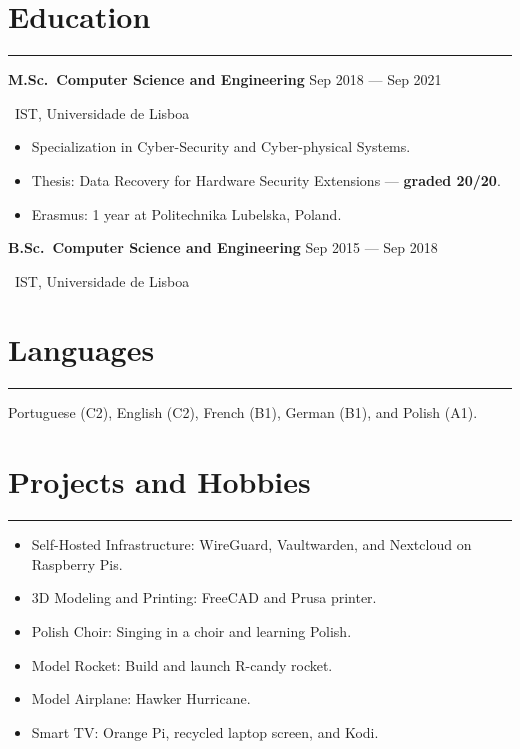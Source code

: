 \documentclass[11pt,a4paper]{article}
\begin{document}
\section*{Education}

\hrule

\textbf{M.Sc.\ Computer Science and Engineering}
\hfill
Sep 2018 --- Sep 2021

\faUniversity\ IST, Universidade de Lisboa

\begin{itemize}[noitemsep]
  \item Specialization in Cyber-Security and Cyber-physical Systems.
  \item Thesis: Data Recovery for Hardware Security Extensions ---
  \textbf{graded 20/20}.
  \item Erasmus: 1 year at Politechnika Lubelska, Poland.
\end{itemize}

\textbf{B.Sc.\ Computer Science and Engineering}
\hfill
Sep 2015 --- Sep 2018

\faUniversity\ IST, Universidade de Lisboa

\section*{Languages}

\hrule

Portuguese (C2), English (C2), French (B1), German (B1), and Polish (A1).

\section*{Projects and Hobbies}

\hrule

\begin{itemize}[noitemsep]
  \item Self-Hosted Infrastructure: WireGuard, Vaultwarden, and Nextcloud on
  Raspberry Pis.
  \item 3D Modeling and Printing: FreeCAD and Prusa printer.
  \item Polish Choir: Singing in a choir and learning Polish.
  \item Model Rocket: Build and launch R-candy rocket.
  \item Model Airplane: Hawker Hurricane.
  \item Smart TV\@: Orange Pi, recycled laptop screen, and Kodi.
\end{itemize}
\end{document}
